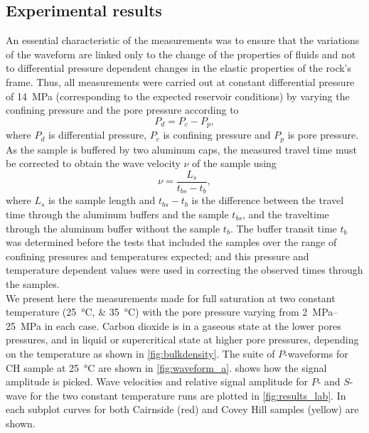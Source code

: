\subsection{Experimental results}
An essential characteristic of the measurements was to ensure that the
variations of the waveform are linked only to the change of the properties of
fluids and not to differential pressure dependent changes in the elastic
properties of the rock's frame. Thus, all measurements were carried out at
constant differential pressure of \SI{14}{\mega\pascal} (corresponding to the
expected reservoir conditions) by varying the confining pressure and the pore
pressure according to
\begin{equation}
 P_{d} = P_{c} - P_{p},
\end{equation}
where $P_{d}$ is differential pressure, $P_{c}$ is confining pressure and
$P_{p}$ is pore pressure. As the sample is buffered by two aluminum caps, the
measured travel time must be corrected to obtain the wave velocity $\nu$ of the
sample using
\begin{equation}
 \nu = \frac{L_{s}}{t_{bs}-t_{b}},
\end{equation}
where $L_s$ is the sample length and $t_{bs} - t_{b}$ is the difference between
the travel time through the aluminum buffers and the sample $t_{bs}$, and the
traveltime through the aluminum buffer without the sample $t_b$. The buffer
transit time $t_b$ was determined before the tests that included the samples
over the range of confining pressures and temperatures expected; and this
pressure and temperature dependent values were used in correcting the observed
times through the samples.\\
We present here the measurements made for full  saturation at two
constant temperature (\SIlist{25;35}{\degreeCelsius}) with the pore pressure
varying from \SIrange[range-units = single]{2}{25}{\mega\pascal} in each case.
Carbon dioxide is in a gaseous state at the lower pores pressures, and in liquid
or supercritical state at higher pore pressures, depending on the temperature as
shown in \cref{fig:bulkdensity}. The suite of $P$-waveforms for CH sample at
\SI{25}{\degreeCelsius} are shown in \cref{fig:waveform_a}.
 shows how the signal amplitude is picked.  Wave velocities
and relative signal amplitude for $P$- and $S$-wave for the two constant
temperature runs are plotted in \cref{fig:results_lab}. In each subplot curves
for both Cairnside (red) and Covey Hill samples (yellow) are shown.
